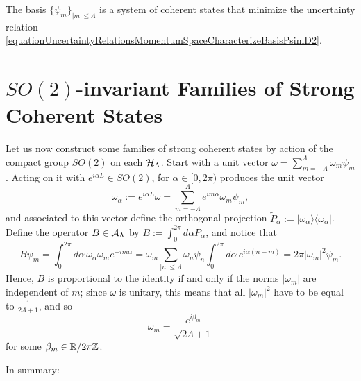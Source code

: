 \begin{proposition}
The basis $\{\psi_m\}_{|m|\leq \Lambda}$ is a system of coherent states that minimize the uncertainty relation \eqref{equationUncertaintyRelationsMomentumSpaceCharacterizeBasisPsimD2}.
\end{proposition}



\section{$SO(2)$-invariant Families of Strong Coherent States}

Let us now construct some families of strong coherent states by action of the compact group $SO(2)$ on each $\mathcal H_\Lambda$. Start with a unit vector $\omega = \sum_{m = -\Lambda}^\Lambda \omega_m \psi_m$. Acting on it with $e^{i \alpha L } \in  SO(2)$, for $\alpha \in [0, 2\pi)$
produces the unit vector
\begin{equation}
    \omega_\alpha := e^{i \alpha L} \omega = \sum_{m = -\Lambda}^\Lambda e^{im\alpha} \omega_m \psi_m,
\end{equation}
and associated to this vector define the orthogonal projection
$\tilde P_\alpha := | \omega_\alpha \rangle \langle \omega_\alpha|$. Define the operator $B \in \mathcal A_{\Lambda}$ by $B := \int_0^{2\pi} d\alpha P_{\alpha}$, and notice that
\begin{equation*}
    B \psi_m = \int_{0}^{2\pi} d\alpha \, \omega_\alpha \overline{\omega_m} e^{-im\alpha} = \overline{\omega_m} \sum_{|n| \leq \Lambda} \omega_n \psi_n \int_0^{2\pi}d\alpha\, e^{i\alpha(n-m)} = 2 \pi |\omega_m|^2 \psi_m.
\end{equation*}
Hence, $B$ is proportional to the identity if and only if the norms $|\omega_m|$ are independent of $m$; since $\omega$ is unitary, this means that all $|\omega_m|^2$ have to be equal to $\frac{1}{2\Lambda + 1}$, and so
\begin{equation*}
    \omega_m = \frac{e^{i \beta_m}}{\sqrt{2\Lambda + 1}}
\end{equation*}
for some $\beta_m \in \mathbb{R}/2\pi \mathbb{Z}$. 

In summary:

